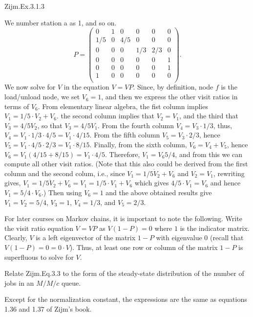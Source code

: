 \begin{exercise}
Zijm.Ex.3.1.3
\begin{solution}
We number  station a as 1, and so on.
\begin{equation*}
  P = 
  \begin{pmatrix}
     0 & 1 & 0 & 0 & 0 &0 \\
     1/5 & 0 & 4/5 & 0 & 0 & 0\\
     0& 0 & 0 & 1/3 & 2/3 & 0 \\
     0 & 0 & 0 & 0 & 0 & 1\\
     0 & 0 & 0 & 0 & 0 & 1\\
     1 & 0 & 0 & 0 & 0 & 0\\
  \end{pmatrix}.
\end{equation*}
We now solve for $V$ in the equation $V = VP$.
Since, by definition, node $f$ is the load/unload node, we set $V_6=1$, and then we express the other visit ratios in terms of $V_6$.
From elementary linear algebra, the fist column implies $V_1 = 1/5 \cdot V_2 + V_6$. the second column implies that $V_2 = V_1$, and the third that $V_3 = 4/5 V_2$, so that $V_3 = 4/5 V_1$.
From the fourth column $V_4 = V_3 \cdot 1/3 $, thus, $V_4 = V_1 \cdot 1/3 \cdot 4/5 = V_1 \cdot 4/15$.
From the fifth column $V_5 = V_3 \cdot 2/3$, hence $V_5 = V_1 \cdot 4/5 \cdot 2/3 = V_1 \cdot 8/15$.
Finally, from the sixth column, $V_6 = V_4+V_5$, hence $V_6 = V_1 (4/15 + 8/15)=V_1 \cdot 4/5$.
Therefore, $V_1 = V_6 5/4$, and from this we can compute all other visit ratios. (Note that this also could be derived from the first column and the second colum, i.e., since $V_1 = 1/5 \dot V_2 + V_6$ and $V_2 = V_1$, rewriting gives, $V_1 = 1/5 \dot V_2 + V_6 = V_1 = 1/5 \cdot V_1 + V_6$ which gives $4/5 \cdot V_1 = V_6$ and hence $V_1 = 5/4 \cdot V_6$.)
Then using $V_6 = 1$ and the above obtained results give $V_1 = V_2 = 5/4$, $V_3 = 1$, $V_4 = 1/3$, and $V_5 = 2/3$.

For later courses on Markov chains, it is important to note the following.
Write the visit ratio equation $V = VP$ as $V(1-P)=0$ where $1$ is the indicator matrix.
Clearly, $V$ is a left eigenvector of the matrix $1-P$ with eigenvalue 0 (recall that $V(1-P) = 0 = 0\cdot V$).
Thus, at least one row or column of the matrix $1-P$ is superfluous to solve for $V$.
\end{solution}
\end{exercise}

\begin{exercise}
  Relate Zijm.Eq.3.3 to the form of the steady-state distribution of
  the number of jobs in an $M/M/c$ queue.
  \begin{solution}
    Except for the normalization constant, the expressions are the
    same as equations 1.36 and 1.37 of Zijm's book.
  \end{solution}
\end{exercise}

